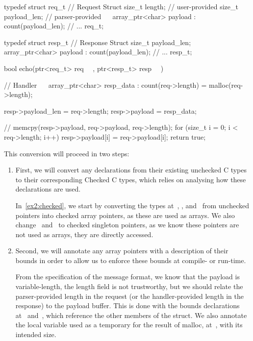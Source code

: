 \begin{code}[label=ex2:checked,float=t,caption={Checked Example (Converted from \autoref{ex1:unchecked})}]
typedef struct req_t {  // Request Struct
  size_t length;         // user-provided
  size_t payload_len;    // parser-provided
~~  array_ptr<char> payload : count(payload_len);
  // ...
} req_t;

typedef struct resp_t {  // Response Struct
  size_t payload_len;
~~  array_ptr<char> payload : count(payload_len);
  // ...
} resp_t;

bool echo(ptr<req_t> req ~~, ptr<resp_t> resp ~~) {  // Handler
~~  array_ptr<char> resp_data : count(req->length) = malloc(req->length);

  resp->payload_len = req->length;
  resp->payload     = resp_data;

  // memcpy(resp->payload, req->payload, req->length);
  for (size_t i = 0; i < req->length; i++) {
    resp->payload[i] = req->payload[i];
  }
  return true;
}
\end{code}

This conversion will proceed in two steps:
\begin{enumerate}
\item First, we will convert any declarations from their existing
unchecked C types to their corresponding Checked C types, which relies
on analysing how these declarations are used.

In~\autoref{ex2:checked}, we start by converting the types
at~, ,
and~ from unchecked pointers into checked array
pointers, as these are used as arrays. We also
change~ and~ to checked
singleton pointers, as we know these pointers are not used as arrays,
they are directly accessed.

\item Second, we will annotate any
array pointers with a description of their bounds in order to allow us
to enforce these bounds at compile- or run-time.

From the specification of the message format, we know that the payload
is variable-length, the length field is not trustworthy, but we should
relate the parser-provided length in the request (or the
handler-provided length in the response) to the payload buffer. This
is done with the bounds declarations at~
and~, which reference the other members of the
struct. We also annotate the local variable used as a temporary for
the result of malloc, at~, with its intended size.
\end{enumerate}

